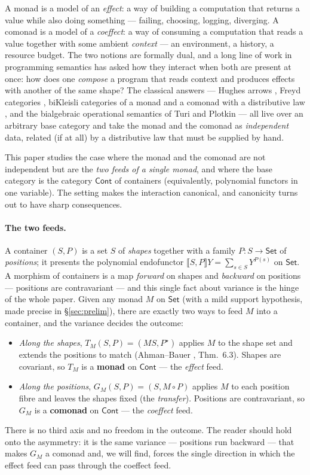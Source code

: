 \documentclass[11pt]{amsart}
\theoremstyle{plain}
\theoremstyle{definition}
\theoremstyle{remark}
\newcommand{\Set}{\mathsf{Set}}
\newcommand{\Cont}{\mathsf{Cont}}
\newcommand{\Ext}[1]{\llbracket #1\rrbracket}
\newcommand{\cont}[2]{(#1,#2)}
\begin{document}
A monad is a model of an \emph{effect}: a way of building a computation that returns a
value while also doing something --- failing, choosing, logging, diverging. A comonad is
a model of a \emph{coeffect}: a way of consuming a computation that reads a value together
with some ambient \emph{context} --- an environment, a history, a resource budget. The two
notions are formally dual, and a long line of work in programming semantics has asked how
they interact when both are present at once: how does one \emph{compose} a program that
reads context and produces effects with another of the same shape? The classical answers
--- Hughes arrows \cite{Hughes00}, Freyd categories \cite{PowerRobinson97,Atkey11},
biKleisli categories of a monad and a comonad with a distributive law
\cite{PowerWatanabe02,UustaluVene08}, and the bialgebraic operational semantics of Turi and
Plotkin \cite{TuriPlotkin97} --- all live over an arbitrary base category and take the
monad and the comonad as \emph{independent} data, related (if at all) by a distributive law
that must be supplied by hand.

This paper studies the case where the monad and the comonad are not independent but are the
\emph{two feeds of a single monad}, and where the base category is the category $\Cont$ of
containers (equivalently, polynomial functors in one variable). The setting makes the
interaction canonical, and canonicity turns out to have sharp consequences.

\paragraph{The two feeds.}
A container $\cont S P$ is a set $S$ of \emph{shapes} together with a family $P\colon S\to
\Set$ of \emph{positions}; it presents the polynomial endofunctor $\Ext{S,P}Y = \sum_{s\in
S} Y^{P(s)}$ on $\Set$. A morphism of containers is a map \emph{forward} on shapes and
\emph{backward} on positions --- positions are contravariant --- and this single fact about
variance is the hinge of the whole paper. Given any monad $M$ on $\Set$ (with a mild
support hypothesis, made precise in \S\ref{sec:prelim}), there are exactly two ways to feed
$M$ into a container, and the variance decides the outcome:
\begin{itemize}
  \item \emph{Along the shapes}, $T_M\cont S P = \cont{MS}{P^\star}$ applies $M$ to the
  shape set and extends the positions to match (Ahman--Bauer \cite{AhmanBauer24}, Thm.~6.3).
  Shapes are covariant, so $T_M$ is a \textbf{monad} on $\Cont$ --- the \emph{effect} feed.
  \item \emph{Along the positions}, $G_M\cont S P = \cont S{M\circ P}$ applies $M$ to each
  position fibre and leaves the shapes fixed (the \emph{transfer}). Positions are
  contravariant, so $G_M$ is a \textbf{comonad} on $\Cont$ --- the \emph{coeffect} feed.
\end{itemize}
There is no third axis and no freedom in the outcome. The reader should hold onto the
asymmetry: it is the same variance --- positions run backward --- that makes $G_M$ a comonad
and, we will find, forces the single direction in which the effect feed can pass through the
coeffect feed.
\end{document}
